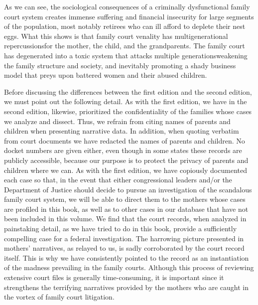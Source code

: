As we can see, the sociological consequences of a criminally dysfunctional family court system creates immense suffering and financial
insecurity for large segments of the population, most notably retirees
who can ill afford to deplete their nest eggs. What this shows is that family court venality has multigenerational repercussions\mdash{}for the mother,
the child, and the grandparents.
The family court has degenerated into a toxic system that
attacks multiple generations\mdash{}weakening the family structure and 
society, and inevitably promoting a shady business model that preys upon
battered women and their abused children. \pfl{}




\noindent{}Before discussing the differences between the first edition 
and the second edition, we must point out the following detail.
As with the first edition, we have in the second edition, likewise, prioritized the confidentiality of the families whose cases we analyze and
dissect. Thus, we refrain from citing names of parents and children
when presenting narrative data. In addition, when quoting verbatim
from court documents we have redacted the names of parents and children. No docket numbers are given either, even though in some states
these records are publicly accessible, because our purpose is to protect
the privacy of parents and children where we can. As with the first edition, we have
copiously documented each case so that, in the 
event that either congressional leaders and/or the Department of Justice should decide to
pursue an investigation of the scandalous family court system, we will
be able to direct them to the mothers whose cases are profiled in this
book, as well as to other cases in our database that have not been included in this volume. We find that the court records, when analyzed in
painstaking detail, as we have tried to do in this book, provide a
sufficiently compelling case for a federal investigation. The harrowing
picture presented in mothers' narratives, as relayed to us, is sadly corroborated by the court record itself. This is why we have consistently
pointed to the record as an instantiation of the madness prevailing in
the family courts. Although this process of reviewing extensive court 
files is generally time-consuming, it is important since it strengthens
the terrifying narratives provided by the mothers who are caught in the
vortex of family court litigation. \pfl{}

